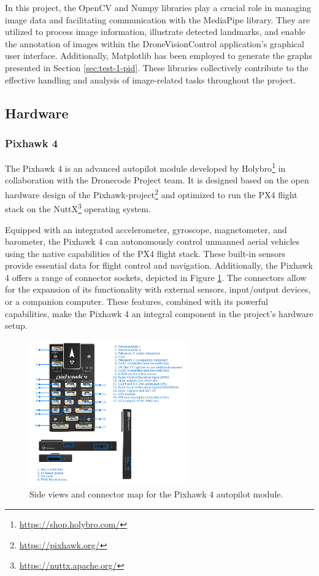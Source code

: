 In this project, the OpenCV and Numpy libraries play a crucial role in managing image data and facilitating communication with the MediaPipe library. They are utilized to process image information, illustrate detected landmarks, and enable the annotation of images within the DroneVisionControl application's graphical user interface. Additionally, Matplotlib has been employed to generate the graphs presented in Section \ref{sec:test-1-pid}. These libraries collectively contribute to the effective handling and analysis of image-related tasks throughout the project.

\subsection{Hardware}
\subsubsection{Pixhawk 4}
\label{subsec:pixhawk}

The Pixhawk 4 is an advanced autopilot module developed by Holybro\footnote{\url{https://shop.holybro.com/}} in collaboration with the Dronecode Project team. It is designed based on the open hardware design of the Pixhawk-project\footnote{\url{https://pixhawk.org/}} and optimized to run the PX4 flight stack on the NuttX\footnote{\url{https://nuttx.apache.org/}} operating system.

Equipped with an integrated accelerometer, gyroscope, magnetometer, and barometer, the Pixhawk 4 can autonomously control unmanned aerial vehicles using the native capabilities of the PX4 flight stack. These built-in sensors provide essential data for flight control and navigation.
Additionally, the Pixhawk 4 offers a range of connector sockets, depicted in Figure \ref{fig:pixhawk4}. The connectors allow for the expansion of its functionality with external sensors, input/output devices, or a companion computer.
These features, combined with its powerful capabilities, make the Pixhawk 4 an integral component in the project's hardware setup.

\begin{figure}[H]
  \centering
  \includegraphics[width=0.6\textwidth,keepaspectratio]{img/pixhawk4.jpg}
  \caption{Side views and connector map for the Pixhawk 4 autopilot module.}
  \label{fig:pixhawk4}
\end{figure}

